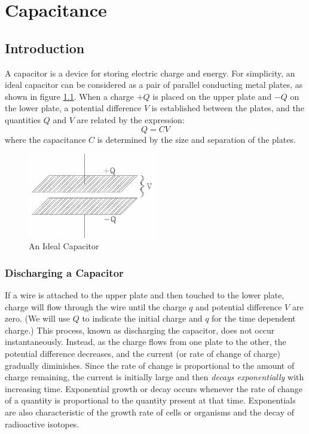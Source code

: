 \chapter{Capacitance}

\section{Introduction}

A capacitor is a device for storing electric charge and energy. For simplicity, an ideal capacitor can be considered as a pair of parallel conducting metal plates, as shown in figure \ref{fig:capacitor}. When a charge $+Q$ is placed on the upper plate and $-Q$ on the lower plate, a potential difference $V$ is established between the plates, and the quantities $Q$ and $V$ are related by the expression:
\begin{equation}
    Q = CV
\end{equation}
where the capacitance $C$ is determined by the size and separation of the plates.

\begin{figure}[h]
    \begin{center}
        \includegraphics[width=0.5\textwidth]{./Exp3/pic/image1.png}
    \end{center}
    \caption{An Ideal Capacitor}
    \label{fig:capacitor}
\end{figure}

\subsection{Discharging a Capacitor}

If a wire is attached to the upper plate and then touched to the lower plate, charge will flow through the wire until the charge $q$ and potential difference $V$ are zero. (We will use $Q$ to indicate the initial charge and $q$ for the time dependent charge.) This process, known as discharging the capacitor, does not occur instantaneously. Instead, as the charge flows from one plate to the other, the potential difference decreases, and the current (or rate of change of charge) gradually diminishes. Since the rate of change is proportional to the amount of charge remaining, the current is initially large and then \emph{decays exponentially} with increasing time. Exponential growth or decay occurs whenever the rate of change of a quantity is proportional to the quantity present at that time. Exponentials are also characteristic of the growth rate of cells or organisms and the decay of radioactive isotopes.

